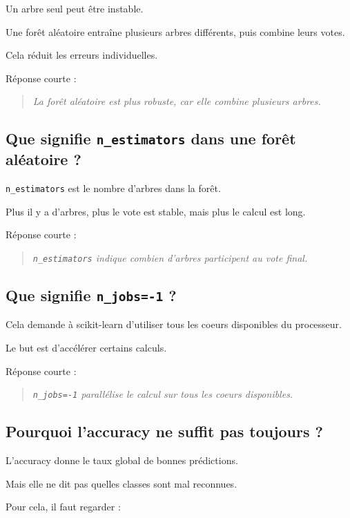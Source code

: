\documentclass[11pt,a4paper]{article}
\begin{document}
Un arbre seul peut être instable.

Une forêt aléatoire entraîne plusieurs arbres différents, puis combine leurs votes.

Cela réduit les erreurs individuelles.

Réponse courte :

\begin{quote}
\itshape La forêt aléatoire est plus robuste, car elle combine plusieurs arbres.
\end{quote}

\subsection{Que signifie \texttt{n\_estimators} dans une forêt aléatoire ?}

\texttt{n\_estimators} est le nombre d'arbres dans la forêt.

Plus il y a d'arbres, plus le vote est stable, mais plus le calcul est long.

Réponse courte :

\begin{quote}
\itshape \texttt{n\_estimators} indique combien d'arbres participent au vote final.
\end{quote}

\subsection{Que signifie \texttt{n\_jobs=-1} ?}

Cela demande à scikit-learn d'utiliser tous les coeurs disponibles du processeur.

Le but est d'accélérer certains calculs.

Réponse courte :

\begin{quote}
\itshape \texttt{n\_jobs=-1} parallélise le calcul sur tous les coeurs disponibles.
\end{quote}

\subsection{Pourquoi l'accuracy ne suffit pas toujours ?}

L'accuracy donne le taux global de bonnes prédictions.

Mais elle ne dit pas quelles classes sont mal reconnues.

Pour cela, il faut regarder :
\end{document}
